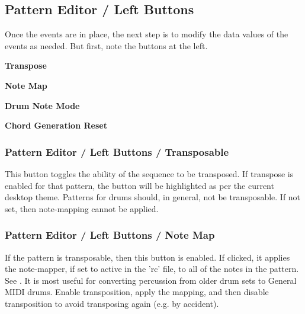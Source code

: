 \subsection{Pattern Editor / Left Buttons}
\label{subsec:pattern_editor_left_buttons}

   Once the events are in place, the next step is to modify the
   data values of the events as needed.
   But first, note the buttons at the left.

   \begin{enumber}
      \item \textbf{Transpose}
      \item \textbf{Note Map}
      \item \textbf{Drum Note Mode}
      \item \textbf{Chord Generation Reset}
   \end{enumber}


\subsubsection{Pattern Editor / Left Buttons / Transposable}
\label{subsubsec:pattern_editor_left_buttons_transposable}

   This button toggles the ability of the sequence to be transposed.
   If transpose is enabled for that pattern, the button will be highlighted as
   per the current desktop theme.  Patterns for drums should, in general, not
   be transposable.
   If not set, then note-mapping cannot be applied.

\subsubsection{Pattern Editor / Left Buttons / Note Map}
\label{subsubsec:pattern_editor_left_buttons_note_map}

   If the pattern is transposable, then this button is enabled.
   If clicked, it applies the note-mapper, if set to active in the
   'rc' file, to all of the notes in the pattern.
   See .
   It is most useful for converting percussion from older drum sets to
   General MIDI drums.  Enable transposition, apply the mapping, and then
   disable transposition to avoid transposing again (e.g. by accident).

